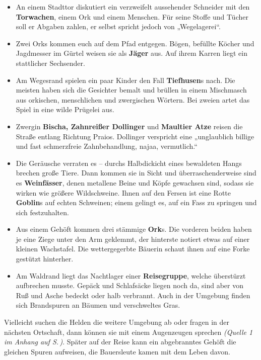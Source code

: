 \begin{itemize}
\item An einem Stadttor diskutiert ein verzweifelt aussehender Schneider mit den \textbf{Torwachen}, einem Ork und einem Menschen. Für seine Stoffe und Tücher soll er Abgaben zahlen, er selbst spricht jedoch von „Wegelagerei“.

\item Zwei Orks kommen euch auf dem Pfad entgegen. Bögen, befüllte Köcher und Jagdmesser im Gürtel weisen sie als \textbf{Jäger} aus. Auf ihrem Karren liegt ein stattlicher Sechsender.

\item Am Wegesrand spielen ein paar Kinder den Fall \textbf{Tiefhusen}s nach. Die meisten haben sich die Gesichter bemalt und brüllen in einem Mischmasch aus orkischen, menschlichen und zwergischen Wörtern. Bei zweien artet das Spiel in eine wilde Prügelei aus.

\item Zwergin \textbf{Bischa, Zahnreißer Dollinger} und \textbf{Maultier Atze} reisen die Straße entlang Richtung Praios. Dollinger verspricht eine „unglaublich billige und fast schmerzfreie Zahnbehandlung, najaa, vermutlich.“

\item Die Geräusche verraten es -- durchs Halbdickicht eines bewaldeten Hangs brechen große Tiere.
Dann kommen sie in Sicht und überraschenderweise sind es \textbf{Weinfässer}, denen metallene Beine und Köpfe gewachsen sind, sodass sie wirken wie größere Wildschweine.
Ihnen auf den Fersen ist eine Rotte \textbf{Goblin}s auf echten Schweinen; einem gelingt es, auf ein Fass zu springen und sich festzuhalten.

\item Aus einem Gehöft kommen drei stämmige \textbf{Ork}s.
Die vorderen beiden haben je eine Ziege unter den Arm geklemmt, der hinterste notiert etwas auf einer kleinen Wachstafel.
Die wettergegerbte Bäuerin schaut ihnen auf eine Forke gestützt hinterher.

\item Am Waldrand liegt das Nachtlager einer \textbf{Reisegruppe}, welche überstürzt aufbrechen musste.
Gepäck und Schlafsäcke liegen noch da, sind aber von Ruß und Asche bedeckt oder halb verbrannt.
Auch in der Umgebung finden sich Brandspuren an Bäumen und verschweltes Gras. 
\end{itemize}

Vielleicht suchen die Helden die weitere Umgebung ab oder fragen in der nächsten Ortschaft, dann können sie mit einem Augenzeugen sprechen \emph{(Quelle 1 im Anhang auf S.\,\pageref{aiw_quelle1})}.
Später auf der Reise kann ein abgebranntes Gehöft die gleichen Spuren aufweisen, die Bauersleute kamen mit dem Leben davon.


